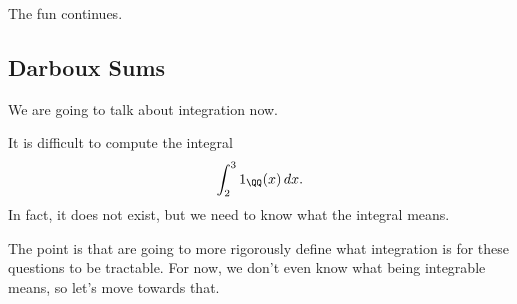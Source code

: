 













The fun continues.

\subsection{Darboux Sums}
We are going to talk about integration now.
\begin{example}
	It is difficult to compute the integral
	\[\int_2^31_{\QQ}(x)\,dx.\]
	In fact, it does not exist, but we need to know what the integral means.
\end{example}
The point is that are going to more rigorously define what integration is for these questions to be tractable. For now, we don't even know what being integrable means, so let's move towards that.

